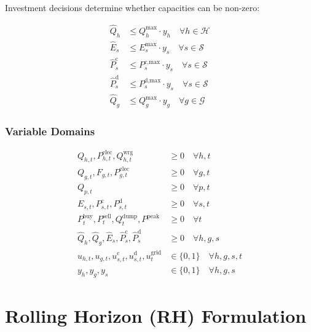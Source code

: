 \documentclass[11pt]{article}
\begin{document}
Investment decisions determine whether capacities can be non-zero:

\begin{align}
\hat{Q}_h &\leq Q_h^{\text{max}} \cdot y_h \quad \forall h \in \mathcal{H} \label{eq:inv_hp} \\
\hat{E}_s &\leq E_s^{\text{max}} \cdot y_s \quad \forall s \in \mathcal{S} \label{eq:inv_storage_e} \\
\hat{P}_s^{\text{c}} &\leq P_s^{\text{c,max}} \cdot y_s \quad \forall s \in \mathcal{S} \label{eq:inv_storage_pc} \\
\hat{P}_s^{\text{d}} &\leq P_s^{\text{d,max}} \cdot y_s \quad \forall s \in \mathcal{S} \label{eq:inv_storage_pd} \\
\hat{Q}_g &\leq Q_g^{\text{max}} \cdot y_g \quad \forall g \in \mathcal{G} \label{eq:inv_gen}
\end{align}

\subsubsection{Variable Domains}

\begin{align}
Q_{h,t}, P_{h,t}^{\text{elec}}, Q_{h,t}^{\text{wrg}} &\geq 0 \quad \forall h, t \label{eq:domain_hp} \\
Q_{g,t}, F_{g,t}, P_{g,t}^{\text{elec}} &\geq 0 \quad \forall g, t \label{eq:domain_gen} \\
Q_{p,t} &\geq 0 \quad \forall p, t \label{eq:domain_p2h} \\
E_{s,t}, P_{s,t}^{\text{c}}, P_{s,t}^{\text{d}} &\geq 0 \quad \forall s, t \label{eq:domain_storage} \\
P_t^{\text{buy}}, P_t^{\text{sell}}, Q_t^{\text{dump}}, P^{\text{peak}} &\geq 0 \quad \forall t \label{eq:domain_grid} \\
\hat{Q}_h, \hat{Q}_g, \hat{E}_s, \hat{P}_s^{\text{c}}, \hat{P}_s^{\text{d}} &\geq 0 \quad \forall h, g, s \label{eq:domain_cap} \\
u_{h,t}, u_{g,t}, u_{s,t}^{\text{c}}, u_{s,t}^{\text{d}}, u_t^{\text{grid}} &\in \{0, 1\} \quad \forall h, g, s, t \label{eq:domain_binary_op} \\
y_h, y_g, y_s &\in \{0, 1\} \quad \forall h, g, s \label{eq:domain_binary_inv}
\end{align}

\section{Rolling Horizon (RH) Formulation}
\end{document}
